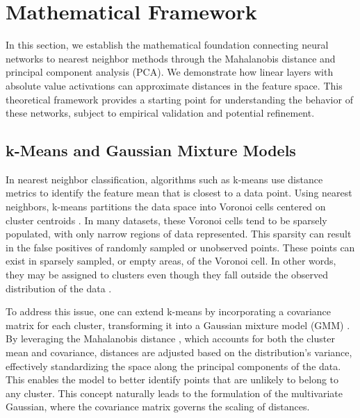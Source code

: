 
\section{Mathematical Framework}
\label{sec:math_framework}

In this section, we establish the mathematical foundation connecting neural networks to nearest neighbor methods through the Mahalanobis distance and principal component analysis (PCA). We demonstrate how linear layers with absolute value activations can approximate distances in the feature space. This theoretical framework provides a starting point for understanding the behavior of these networks, subject to empirical validation and potential refinement.

\subsection{k-Means and Gaussian Mixture Models}
In nearest neighbor classification, algorithms such as k-means use distance metrics to identify the feature mean that is closest to a data point. Using nearest neighbors, k-means partitions the data space into Voronoi cells centered on cluster centroids \cite{macqueen1967methods, hastie2009elements}. In many datasets, these Voronoi cells tend to be sparsely populated, with only narrow regions of data represented. This sparsity can result in the false positives of randomly sampled or unobserved points. These points can exist in sparsely sampled, or empty areas, of the Voronoi cell. In other words, they may be assigned to clusters even though they fall outside the observed distribution of the data \cite{aurenhammer1991voronoi, lloyd1982leastsquares}.

To address this issue, one can extend k-means by incorporating a covariance matrix for each cluster, transforming it into a Gaussian mixture model (GMM) \cite{bishop2006pattern, mclachlan2000finitemixture}. By leveraging the Mahalanobis distance \cite{mahalanobis1936generalized, demaesschalck2000mahalanobis}, which accounts for both the cluster mean and covariance, distances are adjusted based on the distribution's variance, effectively standardizing the space along the principal components of the data. This enables the model to better identify points that are unlikely to belong to any cluster. This concept naturally leads to the formulation of the multivariate Gaussian, where the covariance matrix governs the scaling of distances.

